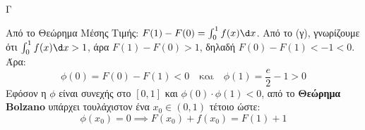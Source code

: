 \begin{thema}{Γ}
\begin{erwthma}
Από το Θεώρημα Μέσης Τιμής: $F(1) - F(0) = \int_0^1 f(x)\d x$.
Από το (γ), γνωρίζουμε ότι $\int_0^1 f(x)\d x > 1$, άρα $F(1) - F(0) > 1$, δηλαδή $F(0) - F(1) < -1 < 0$.
Άρα:
\[ \phi(0) = F(0) - F(1) < 0 \quad \text{και} \quad \phi(1) = \frac{e}{2} - 1 > 0 \]
Εφόσον η $\phi$ είναι συνεχής στο $[0,1]$ και $\phi(0) \cdot \phi(1) < 0$, από το \textbf{Θεώρημα Bolzano} υπάρχει τουλάχιστον ένα $x_0 \in (0, 1)$ τέτοιο ώστε:
\[ \phi(x_0) = 0 \implies F(x_0) + f(x_0) = F(1) + 1 \]
\end{erwthma}
\end{thema}
